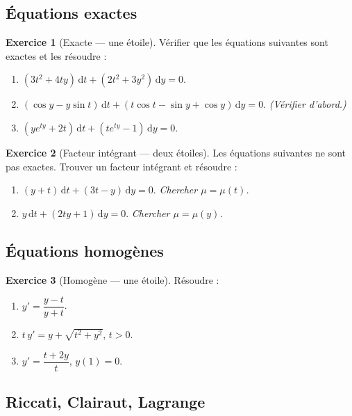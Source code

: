\documentclass[12pt,a4paper,openany]{book}
\theoremstyle{definition}
\newtheorem{exercice}{Exercice}[chapter]
\theoremstyle{plain}
\theoremstyle{remark}
\newcommand{\dd}{\mathrm{d}}
\begin{document}
\subsection*{Équations exactes}

\begin{exercice}[Exacte --- une étoile]
\label{exo:ch2-exact-1}
Vérifier que les équations suivantes sont exactes et les résoudre :
\begin{enumerate}[label=(\alph*)]
\item $(3t^2 + 4ty)\,\dd t + (2t^2 + 3y^2)\,\dd y = 0$.
\item $(\cos y - y\sin t)\,\dd t + (t\cos t - \sin y + \cos y)\,\dd y = 0$. \textit{(Vérifier d'abord.)}
\item $(ye^{ty} + 2t)\,\dd t + (te^{ty} - 1)\,\dd y = 0$.
\end{enumerate}
\end{exercice}

\begin{exercice}[Facteur intégrant --- deux étoiles]
\label{exo:ch2-exact-2}
Les équations suivantes ne sont pas exactes. Trouver un facteur intégrant et résoudre :
\begin{enumerate}[label=(\alph*)]
\item $(y + t)\,\dd t + (3t - y)\,\dd y = 0$. \textit{Chercher $\mu = \mu(t)$.}
\item $y\,\dd t + (2ty + 1)\,\dd y = 0$. \textit{Chercher $\mu = \mu(y)$.}
\end{enumerate}
\end{exercice}

\subsection*{Équations homogènes}

\begin{exercice}[Homogène --- une étoile]
\label{exo:ch2-hom-1}
Résoudre :
\begin{enumerate}[label=(\alph*)]
\item $y' = \dfrac{y - t}{y + t}$.
\item $t\,y' = y + \sqrt{t^2 + y^2}$, $t > 0$.
\item $y' = \dfrac{t + 2y}{t}$, $y(1) = 0$.
\end{enumerate}
\end{exercice}

\subsection*{Riccati, Clairaut, Lagrange}
\end{document}

